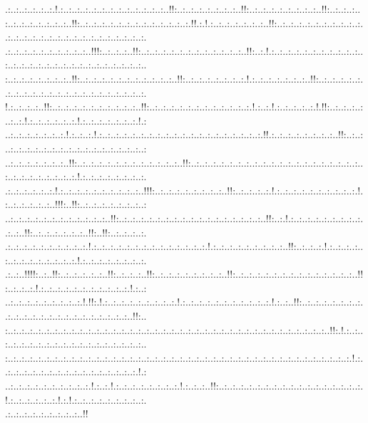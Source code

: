 \documentclass[paper=a4, fontsize=11pt]{scrartcl} %
\numberwithin{equation}{section} %
\numberwithin{figure}{section} %
\numberwithin{table}{section} %
\begin{document}
.:..:..:..:..:..:.!.:..:..:..:..:..:..:..:..:..:..:..:..:..!!:..:..:..:..:..:..:..:..!!:..:..:..:..:..:..:..:..:..!!:..:..:..:..\\:..:..:..:..:..:..:..:..!!:..:..:..:..:..:..:..:..:..:..:..:..:..:.!!.:.!.:..:..:..:..:..:..:..!!:..:..:..:..:..:..:..:..:..:..:..:..:..:..:..:..:..:..:..:..:..:..:..:..:..:..:..:.\\.:..:..:..:..:..:..:..:..:..:..!!!:..:..:..:..!!:..:..:..:..:..:..:..:..:..:..:..:..:..!!:..:.!.:..:..:..:..:..:..:..:..:..:..:..:..:..:..:..:..:..:..:..:..:..:..:..:..:..:..:..:..\\:..:..:..:..:..:..:..:..!!:..:..:..:..:..:..:..:..:..:..:..:..!!:..:..:..:..:..:..:..:.!.:..:..:..:..:..:..:..!!:..:..:..:..:..:..:..:..:..:..:..:..:..:..:..:..:..:..:..:..:..:..:.\\!.:..:..:..:..!!:..:..:..:..:..:..:..:..:..:..:..!!:..:..:..:..:..:..:..:..:..:..:..:..:.!.:..:.!.:..:..:..:..:.!.!!:..:..:..:..:..:..:.!.:..:..:..:..:..:.!.:..:..:..:..:..:..:.!.:\\..:..:..:..:..:..:..:.!.:..:..:.!.:..:..:..:..:..:..:..:..:..:..:..:..:..:..:..:..:..:..:..:.!!.:..:..:..:..:..:..:..:..!!:..:..:..:..:..:..:..:..:..:..:..:..:..:..:..:..:..:..:..:\\..:..:..:..:..:..:..:..!!:..:..:..:..:..:..:..:..:..:..:..:..:..!!:..:..:..:..:..:..:..:..:..:..:..:..:..:..:..:..:..:..:..:..:..:..:..:..:..:..:..:..:..:.!.:..:..:..:..:..:..:..:.\\.:..:..:..:..:..:.!.:..:..:..:..:..:..:..:..:..:..!!!:..:..:..:..:..:..:..:..:..!!:..:..:..:..:.!.:..:..:..:..:..:..:..:..:..:.!.:..:..:..:..:..:..!!!:..!!:..:..:..:..:..:..:..:..:\\..:..:..:..:..:..:..:..:..:..:..:..:..!!:..:..:..:..:..:..:..:..:..:..:..:..:..:..:..:..:..:..!!:..:.!.:..:..:..:..:..:..:..:..:..:..:..!!:..:..:..:..:..:..:..!!:..!!:..:..:..:..:.\\.:..:..:..:..:..:..:..:..:..:.!.:..:..:..:..:..:..:..:..:..:..:..:..:..:.!.:..:..:..:..:..:..:..:..:..!!:..:..:..:.!.:..:..:..:..:..:..:..:..:..:..:..:..:.!.:..:..:..:..:..:..:..:.\\.:..:..!!!!:..:..!!:..:..:..:..:..:..!!:..:..:..:..!!:..:..:..:..:..:..:..:..:..!!:..:..:..:..:..:..:..:..:..:..:..:..:..:..:..!!:..:..:..:.!.:..:..:..:..:..:..:..:..:..:..:.!.:..:\\..:..:..:..:..:..:..:..:..:.!.!!:.!.:..:..:..:..:..:..:..:..:.!.:..:..:..:..:..:..:..:..:..:..:.!.:..:..!!:..:..:..:..:..:..:..:..:..:..:..:..:..:..:..:..:..:..:..:..:..:..:..!!:..\\:..:..:..:..:..:..:..:..:..:..:..:..:..:..:..:..:..:..:..:..:..:..:..:..:..:..:..:..:..:..:..:..:..:..:..:..:..:..:..!!:.!.:..:..:..:..:..:..:..:..:..:..:..:..:..:..:..:..:..:..:..\\:..:..:..:..:..:..:..:..:..:..:..:..:..:..:..:..:..:..:..:..:..:..:..:..:..:..:..:..:..:..:..:..:..:..:..:..:..:..:..:..:..:.!.:..:..:..:..:..:..:..:..:..:..:..:..:..:..:..:..:.!.:\\..:..:..:..:..:..:..:..:..:..:.!.:..:.!.:..:..:..:..:..:..:..:.!.:..:..:..!!:..:..:..:..:..:..:..:..:..:..:..:..:..:..:..:..:..:.!.:..:..:..:..:..:.!.:.!.:..:..:..:..:..:..:..:..:.\\.:..:..:..:..:..:..:..:..:..!!
\end{document}
